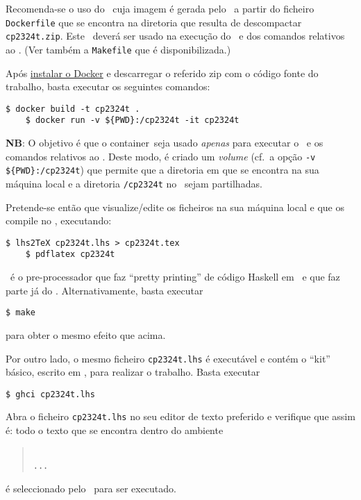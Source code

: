 \documentclass[11pt, a4paper, fleqn]{article}
\begin{document}
Recomenda-se o uso do \container\ cuja imagem é gerada pelo \Docker\ a partir do ficheiro
\texttt{Dockerfile} que se encontra na diretoria que resulta de descompactar
\texttt{cp2324t.zip}. Este \container\ deverá ser usado na execução
do \GHCi\ e dos comandos relativos ao \Latex. (Ver também a \texttt{Makefile}
que é disponibilizada.)

Após \href{https://docs.docker.com/engine/install/}{instalar o Docker} e
descarregar o referido zip com o código fonte do trabalho,
basta executar os seguintes comandos:
\begin{Verbatim}[fontsize=\small]
    $ docker build -t cp2324t .
    $ docker run -v ${PWD}:/cp2324t -it cp2324t
\end{Verbatim}
\textbf{NB}: O objetivo é que o container\ seja usado \emph{apenas} 
para executar o \GHCi\ e os comandos relativos ao \Latex.
Deste modo, é criado um \textit{volume} (cf.\ a opção \texttt{-v \$\{PWD\}:/cp2324t}) 
que permite que a diretoria em que se encontra na sua máquina local 
e a diretoria \texttt{/cp2324t} no \container\ sejam partilhadas.

Pretende-se então que visualize/edite os ficheiros na sua máquina local e que
os compile no \container, executando:
\begin{Verbatim}[fontsize=\small]
    $ lhs2TeX cp2324t.lhs > cp2324t.tex
    $ pdflatex cp2324t
\end{Verbatim}
\LhsToTeX\ é o pre-processador que faz ``pretty printing'' de código Haskell
em \Latex\ e que faz parte já do \container. Alternativamente, basta executar
\begin{Verbatim}[fontsize=\small]
    $ make
\end{Verbatim}
para obter o mesmo efeito que acima.

Por outro lado, o mesmo ficheiro \texttt{cp2324t.lhs} é executável e contém
o ``kit'' básico, escrito em \Haskell, para realizar o trabalho. Basta executar
\begin{Verbatim}[fontsize=\small]
    $ ghci cp2324t.lhs
\end{Verbatim}

\noindent Abra o ficheiro \texttt{cp2324t.lhs} no seu editor de texto preferido
e verifique que assim é: todo o texto que se encontra dentro do ambiente
\begin{quote}\small\tt
{}
\\ ... \\
\end{quote}
é seleccionado pelo \GHCi\ para ser executado.
\end{document}
